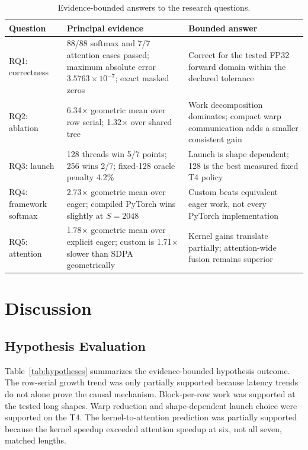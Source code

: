 \documentclass[twoside,twocolumn,10pt]{article}
\begin{document}
\begin{table}[t]
\centering
\caption{Evidence-bounded answers to the research questions.}
\label{tab:rq-summary}
\small
\setlength{\tabcolsep}{5pt}
\begin{tabular}{L{2.7cm}L{6.1cm}L{6.8cm}}
\toprule
Question & Principal evidence & Bounded answer \\
\midrule
RQ1: correctness & 88/88 softmax and 7/7 attention cases passed; maximum
absolute error $3.5763\times10^{-7}$; exact masked zeros & Correct for the
tested FP32 forward domain within the declared tolerance \\
RQ2: ablation & 6.34$\times$ geometric mean over row serial; 1.32$\times$
over shared tree & Work decomposition dominates; compact warp communication
adds a smaller consistent gain \\
RQ3: launch & 128 threads win 5/7 points; 256 wins 2/7; fixed-128 oracle
penalty 4.2\% & Launch is shape dependent; 128 is the best measured fixed T4
policy \\
RQ4: framework softmax & 2.73$\times$ geometric mean over eager; compiled
PyTorch wins slightly at $S=2048$ & Custom beats equivalent eager work, not
every PyTorch implementation \\
RQ5: attention & 1.78$\times$ geometric mean over explicit eager; custom is
1.71$\times$ slower than SDPA geometrically & Kernel gains translate
partially; attention-wide fusion remains superior \\
\bottomrule
\end{tabular}
\end{table}

\clearpage
\section{Discussion}

\subsection{Hypothesis Evaluation}

Table~\ref{tab:hypotheses} summarizes the evidence-bounded hypothesis outcome.
The row-serial growth trend was only partially supported because latency trends
do not alone prove the causal mechanism. Block-per-row work was supported at
the tested long shapes. Warp reduction and shape-dependent launch choice were
supported on the T4. The kernel-to-attention prediction was partially supported
because the kernel speedup exceeded attention speedup at six, not all seven,
matched lengths.
\end{document}
